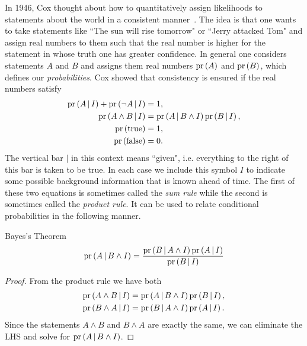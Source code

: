 In 1946, Cox thought about how to quantitatively assign likelihoods to
statements about the world in a consistent manner~\cite{cox_probability_1946}. 
The idea is that one wants to
take statements like ``The sun will rise tomorrow" or ``Jerry attacked Tom" and
assign real numbers to them such that the real number is higher for the
statement in whose truth one has greater confidence.
In general one considers statements $A$ and $B$ and assigns them
real numbers $\operatorname{pr}\left(A\right)$ and $\operatorname{pr}\left(B\right)$, which defines our 
{\it probabilities}. 
Cox showed that consistency is ensured
if the real numbers satisfy
\begin{equation}\begin{aligned}\label{eq:probabilityAxioms}
\operatorname{pr}\left(A\,|\, I\right)+\operatorname{pr}\left(\neg A\,|\, I\right)&=1,\\
\operatorname{pr}\left(A\wedge B\,|\, I\right)&=\operatorname{pr}\left(A\,|\, B\wedge I\right)\operatorname{pr}\left(B\,|\, I\right),\\
\operatorname{pr}\left(\text{true}\right)&=1,\\
\operatorname{pr}\left(\text{false}\right)&=0.
\end{aligned}\end{equation}
The vertical bar $|$ in this context means ``given", i.e. everything to the
right of this bar is taken to be true. In each case we include this symbol $I$
to indicate some possible background information that is known ahead of time.
The first of these two equations is sometimes called the {\it sum
rule} while the second is sometimes called the {\it product
rule}. It can be used to relate conditional probabilities
in the following manner.

\begin{theorem}{Bayes's Theorem}{} 
$$
\operatorname{pr}\left(A\,|\, B\land I\right)=\frac{\operatorname{pr}\left(B\,|\, A\land I\right)\operatorname{pr}\left(A\,|\, I\right)}{\operatorname{pr}\left(B\,|\, I\right)}
$$
  \begin{proof}
  From the product rule we have both
\begin{equation*}\begin{aligned}
\operatorname{pr}\left(A\wedge B\,|\, I\right)&=\operatorname{pr}\left(A\,|\, B\wedge I\right)\operatorname{pr}\left(B\,|\, I\right),\\
\operatorname{pr}\left(B\wedge A\,|\, I\right)&=\operatorname{pr}\left(B\,|\, A\wedge I\right)\operatorname{pr}\left(A\,|\, I\right).
\end{aligned}\end{equation*}
  Since the statements $A\land B$ and $B\land A$ are exactly the same, we can
eliminate the LHS and solve for $\operatorname{pr}\left(A\,|\, B\land I\right)$.
  \end{proof}
\end{theorem}


